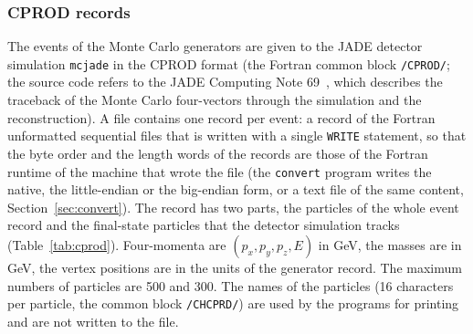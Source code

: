 \subsubsection{CPROD records}
\label{sec:cprodformat}
The events of the Monte Carlo generators are given to the JADE detector simulation \texttt{mcjade} in the CPROD format (the
Fortran common block \texttt{/CPROD/}; the source code refers to the JADE Computing Note 69~\cite{JCN:69}, which describes the traceback of the
Monte Carlo four-vectors through the simulation and the reconstruction). A file contains one record per event: a record of the Fortran unformatted sequential
files that is written with a single \texttt{WRITE} statement, so that the byte order and the length words of the records are those of the Fortran runtime of the machine
that wrote the file (the \texttt{convert} program writes the native, the little-endian or the big-endian form, or a text file of the same content, Section~\ref{sec:convert}). The record has two parts, the
particles of the whole event record and the final-state particles that the detector simulation tracks (Table~\ref{tab:cprod}). Four-momenta are $(p_x,p_y,p_z,E)$ in GeV, the masses are in GeV, the vertex positions are in the
units of the generator record. The maximum numbers of particles are 500 and 300. The names of the
particles (16 characters per particle, the common block \texttt{/CHCPRD/}) are used by the programs for printing and are not written to the file.
